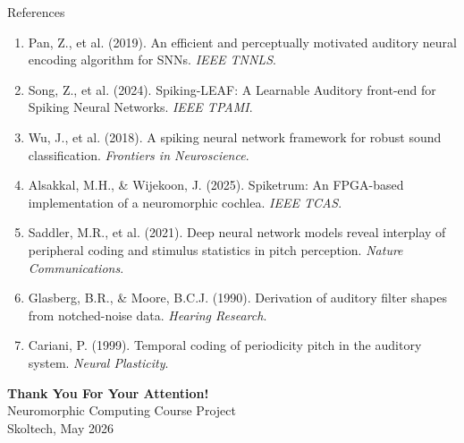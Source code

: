 \documentclass[aspectratio=169,20pt]{beamer}
\begin{document}
\begin{frame}{References} 
\footnotesize
\begin{enumerate}
    \item Pan, Z., et al. (2019). An efficient and perceptually motivated auditory neural encoding algorithm for SNNs. \textit{IEEE TNNLS}.

    \item Song, Z., et al. (2024). Spiking-LEAF: A Learnable Auditory front-end for Spiking Neural Networks. \textit{IEEE TPAMI}.

    \item Wu, J., et al. (2018). A spiking neural network framework for robust sound classification. \textit{Frontiers in Neuroscience}.

    \item Alsakkal, M.H., \& Wijekoon, J. (2025). Spiketrum: An FPGA-based implementation of a neuromorphic cochlea. \textit{IEEE TCAS}.

    \item Saddler, M.R., et al. (2021). Deep neural network models reveal interplay of peripheral coding and stimulus statistics in pitch perception. \textit{Nature Communications}.

    \item Glasberg, B.R., \& Moore, B.C.J. (1990). Derivation of auditory filter shapes from notched-noise data. \textit{Hearing Research}.

    \item Cariani, P. (1999). Temporal coding of periodicity pitch in the auditory system. \textit{Neural Plasticity}.
\end{enumerate}
\end{frame}

{
\begin{frame} 
\vspace{2cm}
\begin{center}
    {\Large\textbf{Thank You For Your Attention!}}\\[1cm]
    {\small Neuromorphic Computing Course Project}\\
    {\small Skoltech, May 2026}
\end{center}
\end{frame}
}
\end{document}
